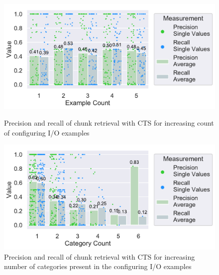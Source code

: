 \documentclass[\myrootdir/main.tex]{subfiles}
\begin{document}
\begin{figure}[htbp]
	\centering
	\begin{minipage}{0.45\textwidth}
		\centering
		\includegraphics[width=\textwidth, clip]{img/big-study/recall-precision-examplecount-CTS.pdf}
		\caption{Precision and recall of chunk retrieval with CTS for increasing count of configuring I/O examples}
		\label{fig:recall-precision-examplecount-CTS}
	\end{minipage}\hfill
	\begin{minipage}{0.45\textwidth}
		\centering
		\includegraphics[width=\textwidth, clip]{img/big-study/recall-precision-categorycount-CTS.pdf}
		\caption{Precision and recall of chunk retrieval with CTS for increasing number of categories present in the configuring I/O examples}
		\label{fig:recall-precision-categorycount-CTS}
	\end{minipage}
\end{figure}
\end{document}
